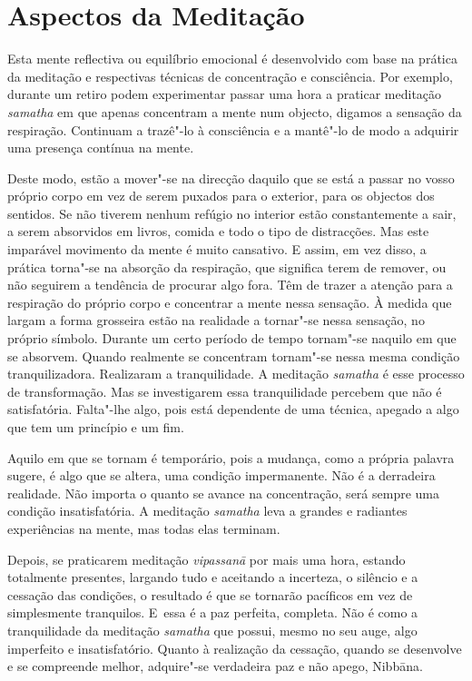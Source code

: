 \section{Aspectos da Meditação}

Esta mente reflectiva ou equilíbrio emocional é desenvolvido com base na prática
da meditação e respectivas técnicas de concentração e consciência. Por
exemplo, durante um retiro podem experimentar passar uma hora a praticar
meditação \emph{samatha} em que apenas concentram a mente num objecto, digamos a
sensação da respiração. Continuam a trazê"-lo à consciência e a mantê"-lo de modo a
adquirir uma presença contínua na mente.

Deste modo, estão a mover"-se na direcção daquilo que se está a passar no vosso
próprio corpo em vez de serem puxados para o exterior, para os objectos dos
sentidos. Se não tiverem nenhum refúgio no interior estão constantemente a sair,
a serem absorvidos em livros, comida e todo o tipo de distracções. Mas este
imparável movimento da mente é muito cansativo. E assim, em vez disso, a prática
torna"-se na absorção da respiração, que significa terem de remover, ou não
seguirem a tendência de procurar algo fora. Têm de trazer a atenção para a
respiração do próprio corpo e concentrar a mente nessa sensação. À medida que
largam a forma grosseira estão na realidade a tornar"-se nessa sensação, no
próprio símbolo. Durante um certo período de tempo tornam"-se naquilo em que se
absorvem. Quando realmente se concentram tornam"-se nessa mesma condição
tranquilizadora. Realizaram a tranquilidade. A meditação \emph{samatha} é esse
processo de transformação. Mas se investigarem essa tranquilidade percebem que
não é satisfatória. Falta"-lhe algo, pois está dependente de uma técnica, apegado
a algo que tem um princípio e um fim.

Aquilo em que se tornam é temporário, pois a mudança, como a própria palavra
sugere, é algo que se altera, uma condição impermanente. Não é a derradeira
realidade. Não importa o quanto se avance na concentração, será sempre uma
condição insatisfatória. A meditação \emph{samatha} leva a grandes e radiantes
experiências na mente, mas todas elas terminam.

Depois, se praticarem meditação \emph{vipassanā} por mais uma hora, estando
totalmente presentes, largando tudo e aceitando a incerteza, o silêncio e a
cessação das condições, o resultado é que se tornarão pacíficos em vez de
simplesmente tranquilos. E~essa é a paz perfeita, completa. Não é como a
tranquilidade da meditação \emph{samatha} que possui, mesmo no seu auge, algo
imperfeito e insatisfatório. Quanto à realização da cessação, quando se
desenvolve e se compreende melhor, adquire"-se verdadeira paz e não apego,
Nibbāna.

